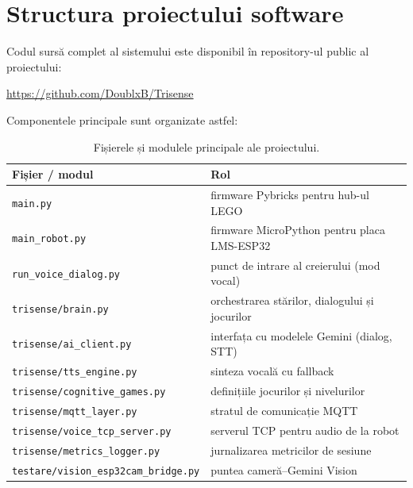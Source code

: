 \appendix

\chapter{Structura proiectului software}
\label{anexa:cod}

Codul sursă complet al sistemului este disponibil în repository-ul public al proiectului:

\begin{center}
    \url{https://github.com/DoublxB/Trisense}
\end{center}

Componentele principale sunt organizate astfel:

\begin{table}[htb]
    \centering
    \caption{Fișierele și modulele principale ale proiectului.}
    \label{tab:structura}
    \small
    \begin{tabular}{|l|l|}
        \hline
        \textbf{Fișier / modul} & \textbf{Rol} \\
        \hline
        \texttt{main.py} & firmware Pybricks pentru hub-ul LEGO \\
        \texttt{main\_robot.py} & firmware MicroPython pentru placa LMS-ESP32 \\
        \texttt{run\_voice\_dialog.py} & punct de intrare al creierului (mod vocal) \\
        \texttt{trisense/brain.py} & orchestrarea stărilor, dialogului și jocurilor \\
        \texttt{trisense/ai\_client.py} & interfața cu modelele Gemini (dialog, STT) \\
        \texttt{trisense/tts\_engine.py} & sinteza vocală cu fallback \\
        \texttt{trisense/cognitive\_games.py} & definițiile jocurilor și nivelurilor \\
        \texttt{trisense/mqtt\_layer.py} & stratul de comunicație MQTT \\
        \texttt{trisense/voice\_tcp\_server.py} & serverul TCP pentru audio de la robot \\
        \texttt{trisense/metrics\_logger.py} & jurnalizarea metricilor de sesiune \\
        \texttt{testare/vision\_esp32cam\_bridge.py} & puntea cameră--Gemini Vision \\
        \hline
    \end{tabular}
\end{table}
